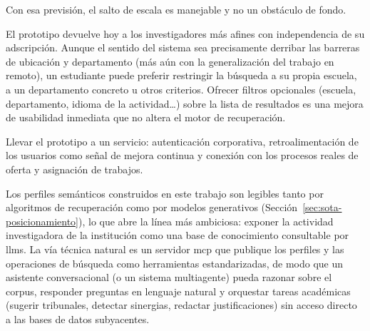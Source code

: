 \begin{mydescription}
    Con esa previsión, el salto de escala es manejable y no un obstáculo de fondo.
    \item[Filtros y controles en la interfaz.]
    El prototipo devuelve hoy a los investigadores más afines con independencia de su adscripción. Aunque el sentido del sistema sea precisamente derribar las barreras de ubicación y departamento (más aún con la generalización del trabajo en remoto), un estudiante puede preferir restringir la búsqueda a su propia escuela, a un departamento concreto u otros criterios.
    Ofrecer filtros opcionales (escuela, departamento, idioma de la actividad\ldots) sobre la lista de resultados es una mejora de usabilidad inmediata que no altera el motor de recuperación.
    \item[Integración institucional.]
    Llevar el prototipo a un servicio: autenticación corporativa, retroalimentación de los usuarios como señal de mejora continua y conexión con los procesos reales de oferta y asignación de trabajos.
    \item[Base de conocimiento conversacional y agentes.]
    Los perfiles semánticos construidos en este trabajo son legibles tanto por algoritmos de recuperación como por modelos generativos (Sección~\ref{sec:sota-posicionamiento}), lo que abre la línea más ambiciosa: exponer la actividad investigadora de la institución como una base de conocimiento consultable por \glspl{llm}.
    La vía técnica natural es un servidor \gls{mcp} que publique los perfiles y las operaciones de búsqueda como herramientas estandarizadas, de modo que un asistente conversacional (o un sistema multiagente) pueda razonar sobre el corpus, responder preguntas en lenguaje natural y orquestar tareas académicas (sugerir tribunales, detectar sinergias, redactar justificaciones) sin acceso directo a las bases de datos subyacentes.
\end{mydescription}
